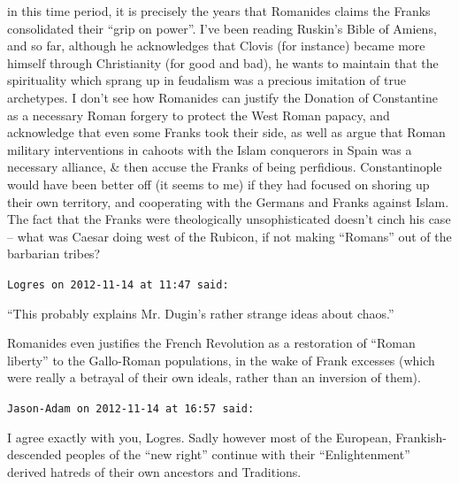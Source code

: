 \begin{footnotesize}
\begin{sffamily}
in this time period, it is precisely the years that Romanides claims the Franks consolidated their ``grip on power''. I've been reading Ruskin's Bible of Amiens, and so far, although he acknowledges that Clovis (for instance) became more himself through Christianity (for good and bad), he wants to maintain that the spirituality which sprang up in feudalism was a precious imitation of true archetypes. I don't see how Romanides can justify the Donation of Constantine as a necessary Roman forgery to protect the West Roman papacy, and acknowledge that even some Franks took their side, as well as argue that Roman military interventions in cahoots with the Islam conquerors in Spain was a necessary alliance, \& then accuse the Franks of being perfidious. Constantinople would have been better off (it seems to me) if they had focused on shoring up their own territory, and cooperating with the Germans and Franks against Islam. The fact that the Franks were theologically unsophisticated doesn't cinch his case -- what was Caesar doing west of the Rubicon, if not making ``Romans'' out of the barbarian tribes?

\hfill

\texttt{Logres on 2012-11-14 at 11:47 said:}

``This probably explains Mr. Dugin's rather strange ideas about chaos.''

Romanides even justifies the French Revolution as a restoration of ``Roman liberty'' to the Gallo-Roman populations, in the wake of Frank excesses (which were really a betrayal of their own ideals, rather than an inversion of them).

\hfill

\texttt{Jason-Adam on 2012-11-14 at 16:57 said:}

I agree exactly with you, Logres. Sadly however most of the European, Frankish-descended peoples of the ``new right'' continue with their ``Enlightenment'' derived hatreds of their own ancestors and Traditions.


\hfill

\end{sffamily}
\end{footnotesize}

